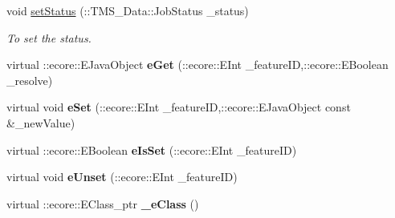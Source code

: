 \begin{DoxyCompactItemize}
void \hyperlink{classTMS__Data_1_1Progression_a58437805707448f4aa0380f95aa2708d}{setStatus} (::TMS\_\-Data::JobStatus \_\-status)
\begin{DoxyCompactList}\small\item\em To set the status. \item\end{DoxyCompactList}\item 
\hypertarget{classTMS__Data_1_1Progression_a7299328329e1f2a6bb3f56f795e4cc43}{
virtual ::ecore::EJavaObject {\bfseries eGet} (::ecore::EInt \_\-featureID,::ecore::EBoolean \_\-resolve)}
\label{classTMS__Data_1_1Progression_a7299328329e1f2a6bb3f56f795e4cc43}

\item 
\hypertarget{classTMS__Data_1_1Progression_a31b4adf5a4fbb27964180d6fc2484120}{
virtual void {\bfseries eSet} (::ecore::EInt \_\-featureID,::ecore::EJavaObject const \&\_\-newValue)}
\label{classTMS__Data_1_1Progression_a31b4adf5a4fbb27964180d6fc2484120}

\item 
\hypertarget{classTMS__Data_1_1Progression_a2d487b9d731028d582ec8657b10b654b}{
virtual ::ecore::EBoolean {\bfseries eIsSet} (::ecore::EInt \_\-featureID)}
\label{classTMS__Data_1_1Progression_a2d487b9d731028d582ec8657b10b654b}

\item 
\hypertarget{classTMS__Data_1_1Progression_a9e2d29f7f8c5838c76f3b0a006d8678c}{
virtual void {\bfseries eUnset} (::ecore::EInt \_\-featureID)}
\label{classTMS__Data_1_1Progression_a9e2d29f7f8c5838c76f3b0a006d8678c}

\item 
\hypertarget{classTMS__Data_1_1Progression_abc2757c717f0babd134bf88fb1b1de4b}{
virtual ::ecore::EClass\_\-ptr {\bfseries \_\-eClass} ()}
\label{classTMS__Data_1_1Progression_abc2757c717f0babd134bf88fb1b1de4b}

\end{DoxyCompactItemize}
